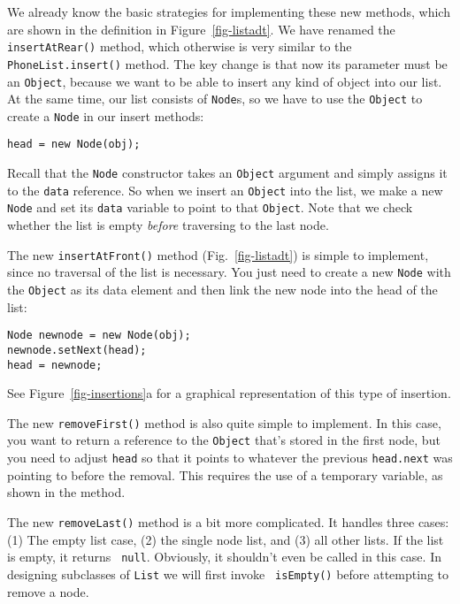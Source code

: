 We already know the basic strategies for implementing these
new methods, which are shown in the definition in
Figure~\ref{fig-listadt}.
We have renamed the {\tt insertAtRear()} method,
which otherwise is very similar to the {\tt PhoneList.\-insert()}
method.  The key change is that now its parameter must be an
{\tt Object}, because we want to be able to insert any kind of object into
our list.  At the same time, our list consists of {\tt Node}s, so we
have to use the {\tt Object} to create a {\tt Node} in our insert
methods:

\begin{jjjlisting}
\begin{lstlisting}
head = new Node(obj);
\end{lstlisting}
\end{jjjlisting}

\noindent Recall that the {\tt Node} constructor takes an {\tt Object}
argument and simply assigns it to the {\tt data} reference.  So when we
insert an {\tt Object} into the list, we make a new {\tt Node} and set
its {\tt data} variable to point to that {\tt Object}.  Note that
we check whether the list is empty {\it before} traversing to the last node.

The new {\tt insertAtFront()} method (Fig.~\ref{fig-listadt}) is
simple to implement, since no traversal of the list is necessary.  You
just need to create a new {\tt Node} with the {\tt Object} as its
data element and then link the new node into the head of the list:

\begin{jjjlisting}
\begin{lstlisting}
Node newnode = new Node(obj);
newnode.setNext(head);
head = newnode;
\end{lstlisting}
\end{jjjlisting}

\noindent See Figure~\ref{fig-insertions}a for a graphical 
representation of this
type of insertion.

The new {\tt removeFirst()} method is also quite simple to implement.
In this case, you want to return a reference to the {\tt Object} that's
stored in the first node, but you need to adjust {\tt head} so that it
points to whatever the previous {\tt head.next} was pointing to before
the removal.  This requires the use of a temporary variable, as shown
in the method.

The new {\tt removeLast()} method is a bit more complicated.  It
handles three cases: (1) The empty list case, (2) the single node
list, and (3) all other lists.  If the list is empty, it returns {\tt
null}. Obviously, it shouldn't even be called in this case.  In
designing subclasses of {\tt List} we will first invoke {\tt
isEmpty()} before attempting to remove a node.

